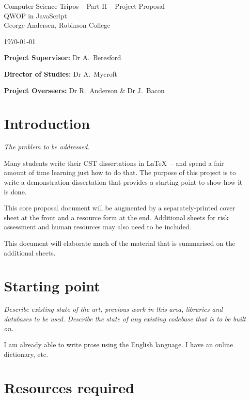 \documentclass[12pt,a4paper,twoside]{article}
\begin{document}
\begin{center}
\Large
Computer Science Tripos -- Part II -- Project Proposal\\[4mm]
\LARGE
QWOP in JavaScript \\[4mm]

\large
George Andersen, Robinson College

\today

\end{center}

\vspace{5mm}

\textbf{Project Supervisor:} Dr A.~Beresford

\textbf{Director of Studies:} Dr A.~Mycroft

\textbf{Project Overseers:} Dr R.~Anderson \& Dr J.~Bacon


\section*{Introduction}

\emph{The problem to be addressed.}

Many students write their CST dissertations in \LaTeX\ -- and spend a fair amount of time learning just how to do that. The purpose of this project is to write a demonstration dissertation that provides
a starting point to show how it is done.

This core proposal document will be augmented by a separately-printed cover sheet at the front and a resource form at the end. Additional sheets for risk assessment and human resources may also need to be included.

This document will elaborate much of the material that is summarised on the additional sheets.

\section*{Starting point}

\emph{Describe existing state of the art, previous work in this area,
  libraries and databases to be used. Describe the state of any
  existing codebase that is to be built on.}

I am already able to write prose using the English language. I have an
online dictionary, etc.

\section*{Resources required}
\end{document}
